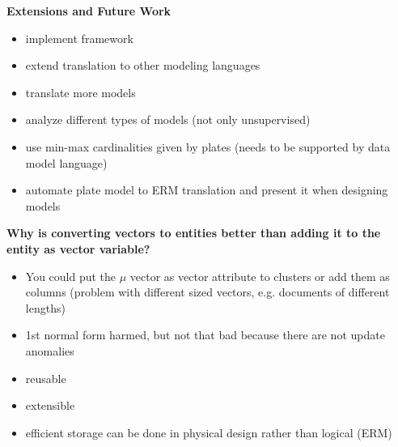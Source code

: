 \textbf{Extensions and Future Work}
\begin{itemize}
\item implement framework
\item extend translation to other modeling languages
\item translate more models
\item analyze different types of models (not only unsupervised)
\item use min-max cardinalities given by plates (needs to be supported by data model language)
\item automate plate model to ERM translation and present it when designing models
\end{itemize}

\textbf{Why is converting vectors to entities better than adding it to the entity as vector variable?}
\begin{itemize}
\item You could put the $\mu$ vector as vector attribute to clusters or add them as columns (problem with different sized vectors, e.g. documents of different lengths)
\item 1st normal form harmed, but not that bad because there are not update anomalies
\item reusable
\item extensible
\item efficient storage can be done in physical design rather than logical (ERM)
\end{itemize}

